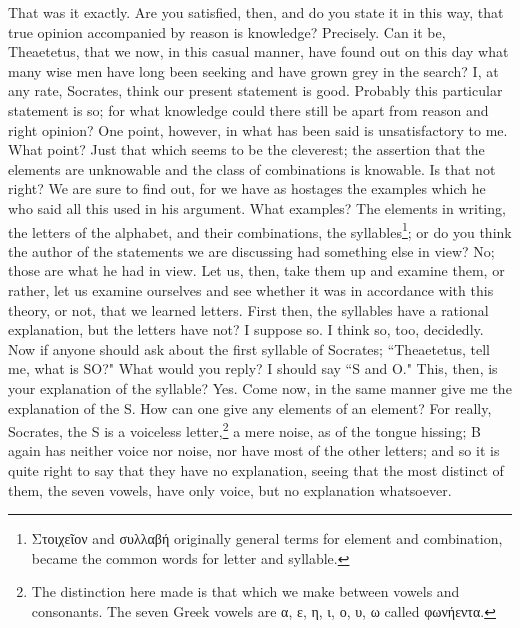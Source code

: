 \documentclass[letterpaper,12pt]{article}
\newcommand{\textgreek}[1]{\begingroup\fontencoding{LGR}\selectfont#1\endgroup}
\newcommand{\stephpag}[1]{\marginnote{\small\itshape\fontfamily{ppl}\selectfont #1}}
\begin{document}
\begin{drama}
\theaetetusspeaks
That was it exactly.
\socratesspeaks
Are you satisfied, then, and do you state it in this way, that true opinion accompanied by reason is knowledge?
\theaetetusspeaks
Precisely. \stephpag{d}
\socratesspeaks
Can it be, Theaetetus, that we now, in this casual manner, have found out on this day what many wise men have long been seeking and have grown grey in the search?
\theaetetusspeaks
I, at any rate, Socrates, think our present statement is good.
\socratesspeaks
Probably this particular statement is so; for what knowledge could there still be apart from reason and right opinion? One point, however, in what has been said is unsatisfactory to me.
\theaetetusspeaks
What point?
\socratesspeaks
Just that which seems to be the cleverest; the assertion that the elements are unknowable and the class of combinations \stephpag{e} is knowable.
\theaetetusspeaks
Is that not right?
\socratesspeaks
We are sure to find out, for we have as hostages the examples which he who said all this used in his argument.
\theaetetusspeaks
What examples?
\socratesspeaks
The elements in writing, the letters of the alphabet, and their combinations, the syllables\footnote{\textgreek{Στοιχεῖον} and \textgreek{συλλαβή} originally general terms for element and combination, became the common words for letter and syllable.}; or do you think the author of the statements we are discussing had something else in view?
\theaetetusspeaks
No; those are what he had in view. \stephpag{203 a}
\socratesspeaks
Let us, then, take them up and examine them, or rather, let us examine ourselves and see whether it was in accordance with this theory, or not, that we learned letters. First then, the syllables have a rational explanation, but the letters have not?
\theaetetusspeaks
I suppose so.
\socratesspeaks
I think so, too, decidedly. Now if anyone should ask about the first syllable of Socrates; ``Theaetetus, tell me, what is SO?" What would you reply?
\theaetetusspeaks
I should say ``S and O."
\socratesspeaks
This, then, is your explanation of the syllable?
\theaetetusspeaks
Yes. \stephpag{b}
\socratesspeaks
Come now, in the same manner give me the explanation of the S.
\theaetetusspeaks
How can one give any elements of an element? For really, Socrates, the S is a voiceless letter,\footnote{The distinction here made is that which we make between vowels and consonants. The seven Greek vowels are \textgreek{α, ε, η, ι, ο, υ, ω} called \textgreek{φωνήεντα}.} a mere noise, as of the tongue hissing; B again has neither voice nor noise, nor have most of the other letters; and so it is quite right to say that they have no explanation, seeing that the most distinct of them, the seven vowels, have only voice, but no explanation whatsoever.

\end{drama}
\end{document}
